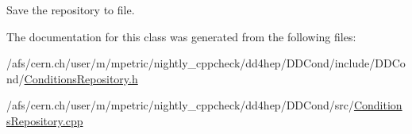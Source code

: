 Save the repository to file. 

The documentation for this class was generated from the following files:\begin{DoxyCompactItemize}
\item 
/afs/cern.ch/user/m/mpetric/nightly\_\-cppcheck/dd4hep/DDCond/include/DDCond/\hyperlink{_conditions_repository_8h}{ConditionsRepository.h}\item 
/afs/cern.ch/user/m/mpetric/nightly\_\-cppcheck/dd4hep/DDCond/src/\hyperlink{_conditions_repository_8cpp}{ConditionsRepository.cpp}\end{DoxyCompactItemize}
